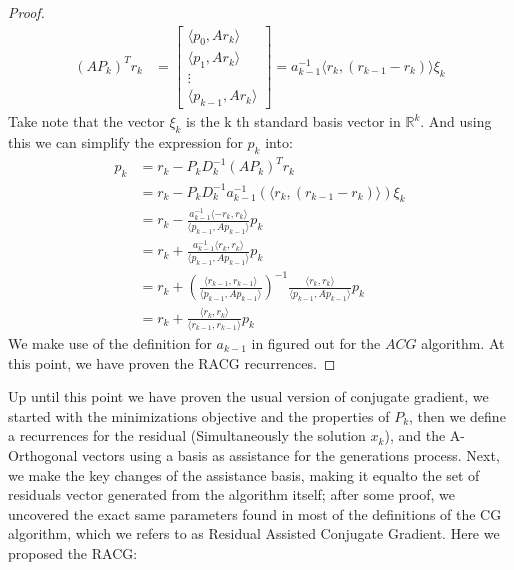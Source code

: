 \documentclass[]{article}
\theoremstyle{definition}
\begin{document}
\begin{proof}
\begin{align}
                    (AP_k)^Tr_k &= 
                    \begin{bmatrix}
                        \langle p_0, Ar_k\rangle
                        \\
                        \langle p_1, Ar_k\rangle
                        \\
                        \vdots
                        \\
                        \langle p_{k - 1}, Ar_k\rangle
                    \end{bmatrix}
                    = 
                    a_{k - 1}^{-1}\langle r_k, (r_{k - 1} - r_{k})\rangle \xi_k
                \end{align}
                Take note that the vector $\xi_k$ is the k th standard basis vector in $\mathbb{R}^k$. And using this we can simplify the expression for $p_k$ into: 
                \begin{align}
                    p_k &= r_k - P_kD^{-1}_k(AP_k)^Tr_k
                    \\
                    &= r_k - P_kD_k^{-1}a_{k - 1}^{-1}(\langle r_k, (r_{k - 1} - r_{k})\rangle) \xi_k
                    \\
                    &= 
                    r_k - \frac{a_{k -1}^{-1}\langle -r_k, r_k\rangle}
                    {\langle p_{k - 1}, Ap_{k - 1}\rangle}p_k
                    \\
                    &= r_k + \frac{a_{k -1}^{-1}\langle r_k, r_k\rangle}
                    {\langle p_{k - 1}, Ap_{k - 1}\rangle}p_k
                    \\
                    &= r_k + 
                    \left(
                        \frac{\langle r_{k - 1}, r_{k - 1}\rangle}{\langle p_{k - 1}, Ap_{k - 1}\rangle}
                    \right)^{-1}
                    \frac{\langle r_k, r_k\rangle}{\langle p_{k - 1}, Ap_{k - 1}\rangle}p_k
                    \\
                    &= 
                    r_k + \frac{\langle r_k, r_k\rangle}{\langle r_{k - 1}, r_{k - 1}\rangle}p_k
                \end{align}
                We make use of the definition for $a_{k-1}$ in figured out for the $ACG$ algorithm. At this point, we have proven the RACG recurrences. 
            \end{proof}
            Up until this point we have proven the usual version of conjugate gradient, we started with the minimizations objective and the properties of $P_k$, then we define a recurrences for the residual (Simultaneously the solution $x_k$), and the A-Orthogonal vectors using a basis as assistance for the generations process. Next, we make the key changes of the assistance basis, making it equalto the set of residuals vector generated from the algorithm itself; after some proof, we uncovered the exact same parameters found in most of the definitions of the CG algorithm, which we refers to as Residual Assisted Conjugate Gradient. Here we proposed the RACG: 
\end{document}
